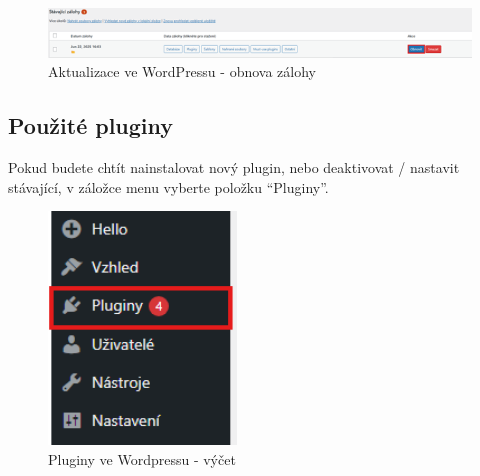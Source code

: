 \documentclass[12pt,a4paper]{article}
\begin{document}
	\begin{figure}[htp]
		\centering
		\includegraphics[width=17cm]{WPrestore}
		\caption{Aktualizace ve WordPressu - obnova zálohy}
		\label{fig:role}
	\end{figure}
	
	\newpage
	\subsection{Použité pluginy}
	Pokud budete chtít nainstalovat nový plugin, nebo deaktivovat / nastavit stávající, v záložce menu vyberte položku “Pluginy”.
			
	\begin{figure}[htp]
		\centering
		\includegraphics[width=5cm]{WPplugins}
		\caption{Pluginy ve Wordpressu - výčet}
		\label{fig:role}
	\end{figure}
	
\end{document}

